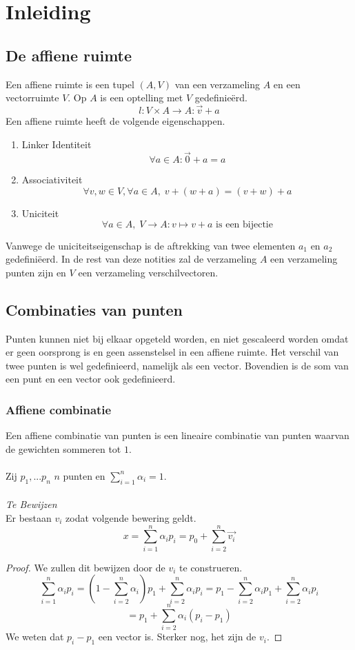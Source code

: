\documentclass[tmi_notities.tex]{subfiles}
\begin{document}
\chapter{Inleiding}
\section{De affiene ruimte}
Een affiene ruimte is een tupel $(A,V)$ van een verzameling $A$ en een vectorruimte $V$. Op $A$ is een optelling met $V$ gedefinie\"erd.
\[
l: V \times A \rightarrow A: \vec{v}+a
\]
Een affiene ruimte heeft de volgende eigenschappen.
\begin{enumerate}
\item Linker Identiteit
\[
\forall a \in A: \vec{0} + a = a
\]
\item Associativiteit
\[
\forall v, w \in V, \forall a \in A,\; v + (w + a) = (v + w) + a
\]
\item Uniciteit
\[
\forall a \in A,\; V \to A\colon v \mapsto v + a \text{ is een bijectie}\]
\end{enumerate}
Vanwege de uniciteitseigenschap is de aftrekking van twee elementen $a_1$ en $a_2$ gedefini\"eerd. In de rest van deze notities zal de verzameling $A$ een verzameling punten zijn en $V$ een verzameling verschilvectoren.


\section{Combinaties van punten}
Punten kunnen niet bij elkaar opgeteld worden, en niet gescaleerd worden omdat er geen oorsprong is en geen assenstelsel in een affiene ruimte.
Het verschil van twee punten is wel gedefinieerd, namelijk als een vector. Bovendien is de som van een punt en een vector ook gedefinieerd.
\subsection{Affiene combinatie}
Een affiene combinatie van punten is een lineaire combinatie van punten waarvan de gewichten sommeren tot $1$.\\\\
Zij $p_1,...p_n$ $n$ punten en $\sum_{i=1}^n\alpha_i=1$.\\\\
\textit{Te Bewijzen}\\
\label{affiene_combinatie}
Er bestaan $v_i$ zodat volgende bewering geldt.
\[
x = \sum_{i=1}^n\alpha_ip_i = p_0 + \sum_{i=2}^n\vec{v_i}
\]

\begin{proof}
We zullen dit bewijzen door de $v_i$ te construeren.
\[
\sum_{i=1}^n\alpha_ip_i
= \left(1-\sum_{i=2}^n\alpha_i\right)p_1 + \sum_{i=2}^n\alpha_ip_i
= p_1 - \sum_{i=2}^n\alpha_ip_1 + \sum_{i=2}^n\alpha_ip_i
\]
\[
=
p_1 + \sum_{i=2}^n\alpha_i(p_i-p_1)
\]
We weten dat $p_i-p_1$ een vector is. Sterker nog, het zijn de $v_i$.
\end{proof}
 
\end{document}
